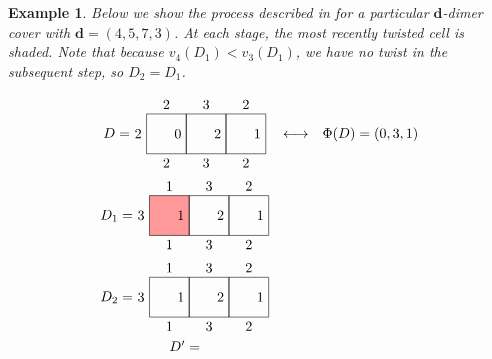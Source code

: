\documentclass[10pt,a4paper]{amsart}
\newtheorem{example}{Example}
\def\bfd{{\mathbf{d}}}
\begin{document}
\begin{example}\label{ex:moving_up}
Below we show the process described in  for a particular $\bfd$-dimer cover
with $\bfd=(4,5,7,3)$. At each stage, the most recently twisted cell is
shaded. Note that because $v_4(D_1)<v_3(D_1)$, we have no twist in the subsequent step,
so $D_2=D_1$.

\[\begin{array}{ccc}
    \raisebox{.34in}{$D=$}\begin{tikzpicture}[scale=.5]
      \draw (0,0) rectangle (2,2);
      \draw (2,0) rectangle (4,2);
      \draw (4,0) rectangle (6,2);
      \node at (1,2) [above] {$2$};
      \node at (3,2) [above] {$3$};
      \node at (5,2) [above] {$2$};
      \node at (1,0) [below] {$2$};
      \node at (3,0) [below] {$3$};
      \node at (5,0) [below] {$2$};
      \node at (0,1) [left]  {$2$};
      \node at (2,1) [left] {$0$};
      \node at (4,1) [left] {$2$};
      \node at (6,1) [left] {$1$};
    \end{tikzpicture} &  \raisebox{.34in}{$\longleftrightarrow$} & \raisebox{.34in}{$\Phi(D)=(0,3,1)$}\\
        \raisebox{.34in}{$D_1=$}\begin{tikzpicture}[scale=.5]
      \draw[fill=red!40!white] (0,0) rectangle (2,2);
      \draw (2,0) rectangle (4,2);
      \draw (4,0) rectangle (6,2);
      \node at (1,2) [above] {$1$};
      \node at (3,2) [above] {$3$};
      \node at (5,2) [above] {$2$};
      \node at (1,0) [below] {$1$};
      \node at (3,0) [below] {$3$};
      \node at (5,0) [below] {$2$};
      \node at (0,1) [left]  {$3$};
      \node at (2,1) [left] {$1$};
      \node at (4,1) [left] {$2$};
      \node at (6,1) [left] {$1$};
    \end{tikzpicture} & & \\
        \raisebox{.34in}{$D_2=$}\begin{tikzpicture}[scale=.5]
      \draw (0,0) rectangle (2,2);
      \draw (2,0) rectangle (4,2);
      \draw (4,0) rectangle (6,2);
      \node at (1,2) [above] {$1$};
      \node at (3,2) [above] {$3$};
      \node at (5,2) [above] {$2$};
      \node at (1,0) [below] {$1$};
      \node at (3,0) [below] {$3$};
      \node at (5,0) [below] {$2$};
      \node at (0,1) [left]  {$3$};
      \node at (2,1) [left] {$1$};
      \node at (4,1) [left] {$2$};
      \node at (6,1) [left] {$1$};
    \end{tikzpicture} &  & \\
        \raisebox{.34in}{$D'=$}\begin{tikzpicture}[scale=.5]

\end{tikzpicture}
\end{array}\]
\end{example}
\end{document}
